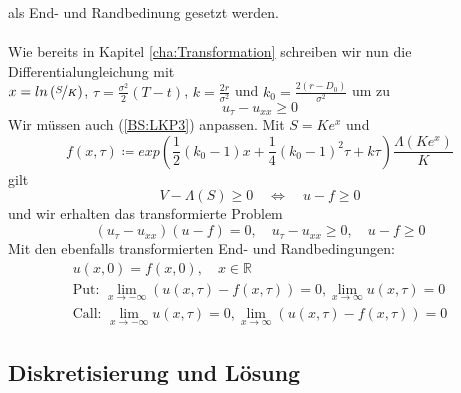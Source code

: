 als End- und Randbedinung gesetzt werden.
\\
\\
Wie bereits in Kapitel \ref{cha:Transformation} schreiben wir nun die Differentialungleichung mit\\ $x = ln\left(\nicefrac{S}{K}\right)$, $\tau = \frac{\sigma^2}{2}\left(T-t\right)$, $k = \frac{2r}{\sigma^2}$ und $k_0 = \frac{2\left(r-D_0\right)}{\sigma^2}$ um zu
\begin{equation*}
u_{\tau} - u_{xx} \geq 0
\end{equation*}
Wir müssen auch (\ref{BS:LKP3}) anpassen. Mit $S = Ke^x$ und
\begin{equation}
f(x,\tau) \coloneqq exp\left(\frac{1}{2}\left(k_0-1\right)x + \frac{1}{4}\left(k_0-1\right)^2\tau + k\tau\right)\frac{\Lambda\left(Ke^x\right)}{K} 
\end{equation}
gilt
\begin{equation}
V- \Lambda(S) \geq 0 \quad \Leftrightarrow \quad u - f \geq 0
\end{equation}
und wir erhalten das transformierte Problem
\begin{equation}
\left(u_{\tau} - u_{xx}\right)\left(u-f\right) = 0, \quad u_{\tau} - u_{xx} \geq 0, \quad  u - f \geq 0 \label{BS:transformiertesProblem}
\end{equation}
Mit den ebenfalls transformierten End- und Randbedingungen:
\begin{gather*}
u(x,0) = f(x,0), \quad x \in \mathbb{R} \\
\text{Put: } \lim\limits_{x \rightarrow -\infty} {\left(u(x,\tau)-f(x,\tau)\right)} = 0, \lim\limits_{x \rightarrow \infty}{u(x,\tau)} = 0 \\
\text{Call: } \lim\limits_{x \rightarrow -\infty} {u(x,\tau)} = 0, \lim\limits_{x \rightarrow \infty} {\left(u(x,\tau)-f(x,\tau)\right)} = 0
\end{gather*}


\subsection{Diskretisierung und Lösung}                     %

